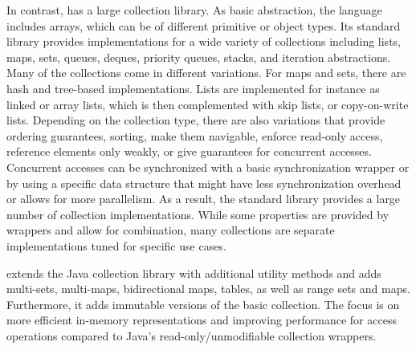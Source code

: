 \documentclass[sigconf, 10pt]{acmart}
\begin{document}

In contrast, 
has a large collection library.
As basic abstraction, the language includes arrays,
which can be of different primitive or object types.
Its standard library provides implementations for a wide variety of collections
including lists, maps, sets, queues, deques, priority queues, stacks,
and iteration abstractions.
Many of the collections come in different variations.
For maps and sets, there are hash and tree-based implementations.
Lists are implemented for instance as linked or array lists,
which is then complemented with skip lists, or copy-on-write lists.
Depending on the collection type,
there are also variations that
provide ordering guarantees, sorting, make them navigable,
enforce read-only access, reference elements only weakly,
or give guarantees for concurrent accesses.
Concurrent accesses can be synchronized
with a basic synchronization wrapper
or by using a specific data structure
that might have less synchronization overhead
or allows for more parallelism.
%
As a result,
the standard library provides a large number of collection implementations.
While some properties are provided by wrappers
and allow for combination,
many collections are separate implementations tuned for specific use cases.


extends the Java collection library with additional utility methods
and adds
multi-sets, multi-maps,  bidirectional maps, tables, as well as range sets and maps.
Furthermore, it adds immutable versions of the basic collection.
The focus is on more efficient in-memory representations
and improving performance for access operations
compared to Java's read-only/unmodifiable collection wrappers.
\end{document}

